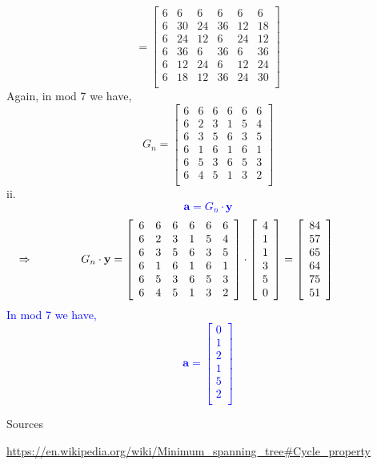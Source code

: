 \documentclass[11pt]{article}
\begin{document}
\begin{itemize}
{\[  = 
   \left[ {\begin{array}{cccccc}
   6 & 6 & 6 & 6 & 6 & 6\\
   6 & 30 & 24 & 36 & 12 & 18\\
   6 & 24 & 12 & 6 & 24 & 12\\
   6 & 36 & 6 & 36 & 6 & 36\\
   6 & 12 & 24 & 6 & 12 & 24\\
   6 & 18 & 12 & 36 & 24 & 30\\
  \end{array} } \right]  
\]
Again, in mod 7 we have, 
 \[
 G_n =
   \left[ {\begin{array}{cccccc}
   6 & 6 & 6 & 6 & 6 & 6\\
   6 & 2 & 3 & 1 & 5 & 4\\
   6 & 3 & 5 & 6 & 3 & 5\\
   6 & 1 & 6 & 1 & 6 & 1\\
   6 & 5 & 3 & 6 & 5 & 3\\
   6 & 4 & 5 & 1 & 3 & 2\\
  \end{array} } \right]
  \]
}
\phantom{d.} ii.
\textcolor{blue}{ 
$$\textbf{a} = G_n \cdot \textbf{y}$$
 \[
 \Rightarrow \hspace{1.5cm} G_n \cdot \textbf{y} =
   \left[ {\begin{array}{cccccc}
   6 & 6 & 6 & 6 & 6 & 6\\
   6 & 2 & 3 & 1 & 5 & 4\\
   6 & 3 & 5 & 6 & 3 & 5\\
   6 & 1 & 6 & 1 & 6 & 1\\
   6 & 5 & 3 & 6 & 5 & 3\\
   6 & 4 & 5 & 1 & 3 & 2\\
  \end{array} } \right]
  \cdot
   \left[ {\begin{array}{c}
   4\\
   1\\
   1\\
   3\\
   5\\
   0\\
  \end{array} } \right]
   	 =
     \left[ {\begin{array}{c}
   84\\
   57\\
   65\\
   64\\
   75\\
   51\\
  \end{array} } \right]
  \hspace{2cm}
    \]
In mod 7 we have,
  \[
\textbf{a} =
  \left[ {\begin{array}{c}
   0\\
   1\\
   2\\
   1\\
   5\\
   2\\
  \end{array} } \right]
\]
}

\end{itemize}

\begin{center}
Sources
\end{center}

\url{https://en.wikipedia.org/wiki/Minimum_spanning_tree#Cycle_property}
\end{document}
